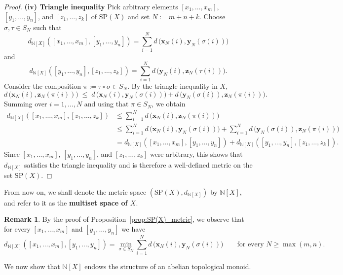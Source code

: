 \documentclass[10pt,a4paper]{article}
\theoremstyle{definition}
\newtheorem{remark}[theorem]{Remark}
\newcommand{\SP}{\mathrm{SP}}
\newcommand{\N}{\mathbb{N}}
\begin{document}
\begin{proof}
    \noindent\textbf{(iv) Triangle inequality}
        Pick arbitrary elements $[x_1,\dots,x_m]$, $[y_1,\ldots,y_n]$, and
    $[z_1,\ldots,z_k]$ of $\SP(X)$ and set $N := m+n+k$.
    Choose $\sigma,\tau \in S_N$ such that
    \[
    d_{\N[X]}([x_1,\ldots,x_m],[y_1,\ldots,y_n])
    = \sum_{i=1}^{N} d\,\bigl(\mathbf{x}_N(i),\mathbf{y}_N(\sigma(i))\bigr)
    \]
    and
    \[
    d_{\N[X]}([y_1,\ldots,y_n],[z_1,\ldots,z_k])
    = \sum_{i=1}^{N} d\,\bigl(\mathbf{y}_N(i),\mathbf{z}_N(\tau(i))\bigr).
    \]
    Consider the composition $\pi := \tau \circ \sigma \in S_N$.
    By the triangle inequality in $X$,
    \[
    d\,\bigl(\mathbf{x}_N(i),\mathbf{z}_N(\pi(i))\bigr)
    \;\le\;
    d\,\bigl(\mathbf{x}_N(i),\mathbf{y}_N(\sigma(i))\bigr)
    + d\,\bigl(\mathbf{y}_N(\sigma(i)),\mathbf{z}_N(\pi(i))\bigr).
    \]
    Summing over $i=1,\dots,N$ and using that $\pi \in S_N$, we obtain
    \begin{align*}
    d_{\N[X]}([x_1,\ldots,x_m],[z_1,\ldots,z_k])
    &\le \sum_{i=1}^{N} d\,\bigl(\mathbf{x}_N(i),\mathbf{z}_N(\pi(i))\bigr) \\
    &\le \sum_{i=1}^{N} d\,\bigl(\mathbf{x}_N(i),\mathbf{y}_N(\sigma(i))\bigr)
    + \sum_{i=1}^{N} d\,\bigl(\mathbf{y}_N(\sigma(i)),\mathbf{z}_N(\pi(i))\bigr) \\
    &= d_{\N[X]}([x_1,\ldots,x_m],[y_1,\ldots,y_n])
    + d_{\N[X]}([y_1,\ldots,y_n],[z_1,\ldots,z_k]).
    \end{align*}
    Since $[x_1,\dots,x_m]$, $[y_1,\dots,y_n]$, and $[z_1,\dots,z_k]$ were
    arbitrary, this shows that $d_{\N[X]}$ satisfies the triangle inequality and is
    therefore a well-defined metric on the set $\SP(X)$.
\end{proof}

From now on, we shall denote the metric space $(\SP(X), d_{\N[X]})$ by
$\N[X]$, and refer to it as the \textbf{multiset space of $X$}.


\begin{remark}\label{remark:d_SP_suff_condition}
    By the proof of Proposition~\ref{prop:SP(X)_metric}, we observe that for every
    $[x_1,\ldots,x_m]$ and $[y_1,\ldots,y_n]$ we have
    \[
    d_{\N[X]}([x_1,\dots,x_m],[y_1,\dots,y_n])
    =
    \min_{\sigma \in S_N}
    \sum_{i=1}^{N} d\,\bigl(\mathbf{x}_N(i),\mathbf{y}_N(\sigma(i))\bigr)
    \qquad\text{for every } N \ge \max(m,n).
    \]
\end{remark}

We now show that $\N[X]$ endows the
structure of an abelian topological monoid.
\end{document}
